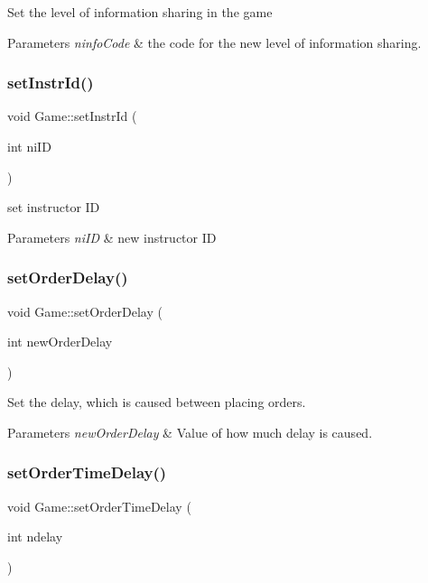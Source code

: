 Set the level of information sharing in the game 
\begin{DoxyParams}{Parameters}
{\em ninfo\+Code} & the code for the new level of information sharing. \\
\hline
\end{DoxyParams}
\mbox{\label{classGame_ab62c0ccec274f408c3584d353fd0da79}} 
\subsubsection{\texorpdfstring{set\+Instr\+Id()}{setInstrId()}}
{\footnotesize\ttfamily void Game\+::set\+Instr\+Id (\begin{DoxyParamCaption}\item[{int}]{ni\+ID }\end{DoxyParamCaption})}

set instructor ID 
\begin{DoxyParams}{Parameters}
{\em ni\+ID} & new instructor ID \\
\hline
\end{DoxyParams}
\mbox{\label{classGame_a89df2f584b7ccfdf5c2367bd2ed85920}} 
\subsubsection{\texorpdfstring{set\+Order\+Delay()}{setOrderDelay()}}
{\footnotesize\ttfamily void Game\+::set\+Order\+Delay (\begin{DoxyParamCaption}\item[{int}]{new\+Order\+Delay }\end{DoxyParamCaption})}

Set the delay, which is caused between placing orders. 
\begin{DoxyParams}{Parameters}
{\em new\+Order\+Delay} & Value of how much delay is caused. \\
\hline
\end{DoxyParams}
\mbox{\label{classGame_acf5b10b8b268b443600518240a1591b5}} 
\subsubsection{\texorpdfstring{set\+Order\+Time\+Delay()}{setOrderTimeDelay()}}
{\footnotesize\ttfamily void Game\+::set\+Order\+Time\+Delay (\begin{DoxyParamCaption}\item[{int}]{ndelay }\end{DoxyParamCaption})}

